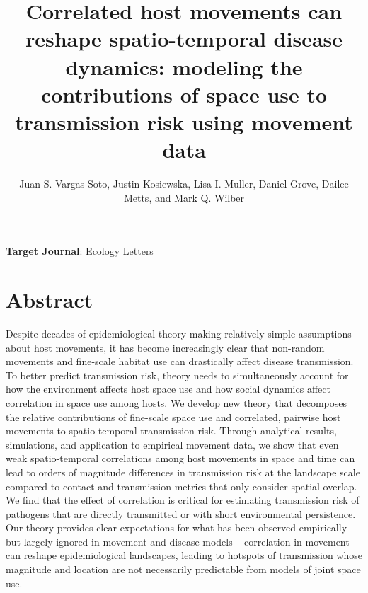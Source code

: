 \documentclass[letterpaper]{article}
\title{Correlated host movements can reshape spatio-temporal disease dynamics: modeling the contributions of space use to transmission risk using movement data}
\author{Juan S. Vargas Soto, Justin Kosiewska, Lisa I. Muller, Daniel Grove, Dailee Metts, and Mark Q. Wilber}
\affil{School of Natural Resources, University of Tennessee, Knoxville, TN}
\date{}
\begin{document}
\maketitle

\noindent
\textbf{Target Journal}: Ecology Letters

\section*{Abstract}

Despite decades of epidemiological theory making relatively simple assumptions about host movements, it has become increasingly clear that non-random movements and fine-scale habitat use can drastically affect disease transmission. To better predict transmission risk, theory needs to simultaneously account for how the environment affects host space use and how social dynamics affect correlation in space use among hosts. We develop new theory that decomposes the relative contributions of fine-scale space use and correlated, pairwise host movements to spatio-temporal transmission risk. Through analytical results, simulations, and application to empirical movement data, we show that even weak spatio-temporal correlations among host movements in space and time can lead to orders of magnitude differences in transmission risk at the landscape scale compared to contact and transmission metrics that only consider spatial overlap. We find that the effect of correlation is critical for estimating transmission risk of pathogens that are directly transmitted or with short environmental persistence. Our theory provides clear expectations for what has been observed empirically but largely ignored in movement and disease models -- correlation in movement can reshape epidemiological landscapes, leading to hotspots of transmission whose magnitude and location are not necessarily predictable from models of joint space use.
\end{document}
